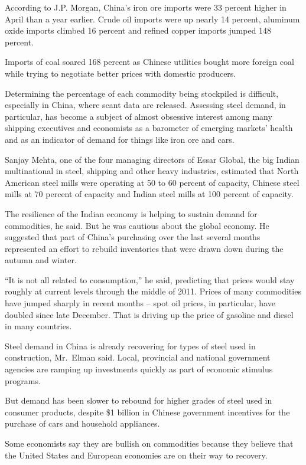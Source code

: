 ﻿\documentclass[12pt,a4paper,onecolumn]{article}
\begin{document}
According to J.P. Morgan, China's iron ore imports were 33 percent higher in April than a year
earlier. Crude oil imports were up nearly 14 percent, aluminum oxide imports climbed 16 percent and
refined copper imports jumped 148 percent.

Imports of coal soared 168 percent as Chinese utilities bought more foreign coal while trying to
negotiate better prices with domestic producers.

Determining the percentage of each commodity being stockpiled is difficult, especially in China,
where scant data are released. Assessing steel demand, in particular, has become a subject of almost
obsessive interest among many shipping executives and economists as a barometer of emerging markets'
health and as an indicator of demand for things like iron ore and cars.

Sanjay Mehta, one of the four managing directors of Essar Global, the big Indian multinational in
steel, shipping and other heavy industries, estimated that North American steel mills were operating
at 50 to 60 percent of capacity, Chinese steel mills at 70 percent of capacity and Indian steel
mills at 100 percent of capacity.

The resilience of the Indian economy is helping to sustain demand for commodities, he said. But he
was cautious about the global economy. He suggested that part of China's purchasing over the last
several months represented an effort to rebuild inventories that were drawn down during the autumn
and winter.

``It is not all related to consumption,'' he said, predicting that prices would stay roughly at
current levels through the middle of 2011. Prices of many commodities have jumped sharply in recent
months -- spot oil prices, in particular, have doubled since late December. That is driving up the
price of gasoline and diesel in many countries.

Steel demand in China is already recovering for types of steel used in construction, Mr.~Elman said.
Local, provincial and national government agencies are ramping up investments quickly as part of
economic stimulus programs.

But demand has been slower to rebound for higher grades of steel used in consumer products, despite
\$1 billion in Chinese government incentives for the purchase of cars and household appliances.

Some economists say they are bullish on commodities because they believe that the United States and
European economies are on their way to recovery.
\end{document}
